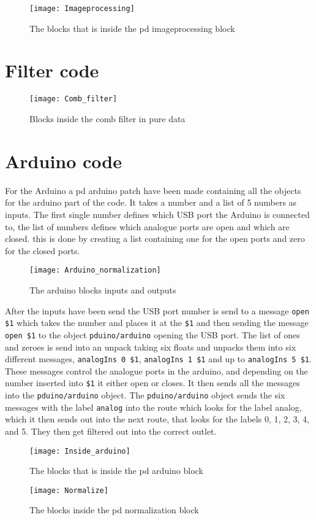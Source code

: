 \begin{figure}
\centering
\texttt{[image: Imageprocessing]}
\caption{The blocks that is inside the pd imageprocessing block}
\label{Fig:Imageprocessing}
\end{figure}

\section{Filter code}

\begin{figure}
\centering
\texttt{[image: Comb\_filter]}
\caption{Blocks inside the comb filter in pure data}
\label{Fig:Comb_filter}
\end{figure}

\section{Arduino code}
For the Arduino a pd arduino patch have been made containing all the objects for the arduino part of the code. It takes a number and a list of 5 numbers as inputs. The first single number defines which USB port the Arduino is connected to, the list of numbers defines which analogue ports are open and which are closed. this is done by creating a list containing one for the open ports and zero for the closed ports. 

\begin{figure}
\centering
\texttt{[image: Arduino\_normalization]}
\caption{The arduino blocks inputs and outputs}
\label{Fig:Arudino_normalization}
\end{figure}

After the inputs have been send the USB port number is send to a message \texttt{open \$1} which takes the number and places it at the \texttt{\$1} and then sending the message \texttt{open \$1} to the object \texttt{pduino/arduino}
opening the USB port. 
The list of ones and zeroes is send into an unpack taking six floats and unpacks them into six different messages, \texttt{analogIns 0 \$1}, \texttt{analogIns 1 \$1} and up to \texttt{analogIns 5 \$1}. These messages control the analogue ports in the arduino, and depending on the number inserted into \texttt{\$1} it either open or closes. It then sends all the messages into the \texttt{pduino/arduino} object.
The \texttt{pduino/arduino} object sends the six messages with the label \texttt{analog} into the route which looks for the label analog, which it then sends out into the next route, that looks for the labels 0, 1, 2, 3, 4, and 5. They then get filtered out into the correct outlet.

\begin{figure}
\centering
\texttt{[image: Inside\_arduino]}
\caption{The blocks that is inside the pd arduino block}
\label{Fig:Inside_arduino}
\end{figure}



\begin{figure}
\centering
\texttt{[image: Normalize]}
\caption{The blocks inside the pd normalization block}
\label{Fig:Normalize}
\end{figure}